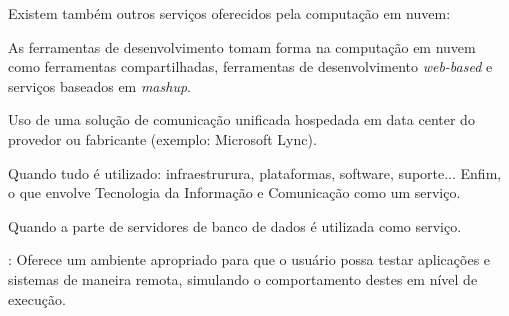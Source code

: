 Existem também outros serviços oferecidos pela computação em nuvem:

\begin{itemise}

     As ferramentas de desenvolvimento tomam
    forma na computação em nuvem como ferramentas compartilhadas, ferramentas de
    desenvolvimento \emph{web-based} e serviços baseados em \emph{mashup}. 

     Uso de uma solução de comunicação unificada
    hospedada em data center do provedor ou fabricante (exemplo: Microsoft Lync). 

     Quando tudo é utilizado: infraestrurura,
    plataformas, software, suporte... Enfim, o que envolve Tecnologia da Informação e
    Comunicação como um serviço. 

     Quando a parte de servidores de banco de dados
    é utilizada como serviço.

    : Oferece um ambiente apropriado para que o usuário
    possa testar aplicações e sistemas de maneira remota, simulando o comportamento destes
    em nível de execução.

\end{itemise}

\undef\itemm

